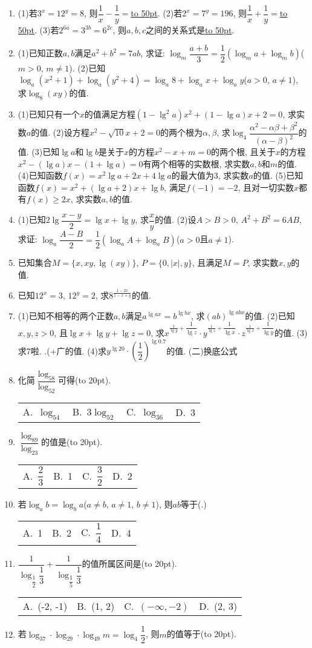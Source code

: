 \documentclass[10pt,a4paper]{article}
\newcommand{\blank}[1]{\underline{\hbox to #1pt{}}}
\newcommand{\bracket}[1]{(\hbox to #1pt{})}
\newcommand{\fourch}[4]{\par\begin{tabular}{p{.23\textwidth}p{.23\textwidth}p{.23\textwidth}p{.23\textwidth}}
A.~#1 &B.~#2& C.~#3& D.~#4
\end{tabular}}
\begin{document}
\begin{enumerate}[1.]
\item (1)若$3^x=12^y=8$, 则$\dfrac 1x-\dfrac 1y=$\blank{50}.
(2)若$2^x=7^y=196$, 则$\dfrac 1x+\dfrac 1y=$\blank{50}.
(3)若$2^{6a}=3^{3b}=6^{2c}$, 则$a,b,c$之间的关系式是\blank{50}.
\item (1)已知正数$a,b$满足$a^2+b^2=7ab$, 求证: $\log _m\dfrac{a+b}3=\dfrac 12(\log _ma+\log _mb)$($m>0$, $m\ne 1$).
(2)已知$\log _a(x^2+1)+\log _a(y^2+4)=\log _a8+\log _ax+\log _ay$($a>0$, $a\ne 1$), 求$\log _8(xy)$的值.
\item (1)已知只有一个$x$的值满足方程$(1-\lg ^2a)x^2+(1-\lg a)x+2=0$, 求实数$a$的值.
(2)设方程$x^2-\sqrt {10}x+2=0$的两个根为$\alpha ,\beta$, 求$\log _4\dfrac{\alpha ^2-\alpha \beta +\beta ^2}{(\alpha -\beta)^2}$的值.
(3)已知$\lg a$和$\lg b$是关于$x$的方程$x^2-x+m=0$的两个根, 且关于$x$的方程$x^2-(\lg a)x-(1+\lg a)=0$有两个相等的实数根, 求实数$a,b$和$m$的值.
(4)已知函数$f(x)=x^2\lg a+2x+4\lg a$的最大值为3, 求实数$a$的值.
(5)已知函数$f(x)=x^2+(\lg a+2)x+\lg b$, 满足$f(-1)=-2$, 且对一切实数$x$都有$f(x)\ge 2x$, 求实数$a,b$的值.
\item (1)已知$2\lg \dfrac{x-y}2=\lg x+\lg y$, 求$\dfrac xy$的值.
(2)设$A>B>0$, $A^2+B^2=6AB$, 求证: $\log _a\dfrac{A-B}2=\dfrac 12(\log _aA+\log _aB)$($a>0$且$a\ne 1$).
\item 已知集合$M=\{x,xy,\lg (xy)\}$, $P=\{0,|x|,y\}$, 且满足$M=P$, 求实数$x,y$的值.
\item 已知$12^x=3$, $12^y=2$, 求$8^{\frac{1-2x}{1-x+y}}$的值.
\item (1)已知不相等的两个正数$a,b$满足$a^{\lg ax}=b^{\lg bx}$, 求$(ab)^{\lg abx}$的值.
(2)已知$x,y,z>0$, 且$\lg x+\lg y+\lg z=0$, 求$x^{\frac 1{\lg y}+\dfrac 1{\lg z}}\cdot y^{\frac 1{\lg z}+\dfrac 1{\lg x}}\cdot z^{\frac 1{\lg x}+\dfrac 1{\lg y}}$的值.
(3)求7啦. .(+广的值.
(4)求$y^{\lg 20}\cdot (\dfrac 12)^{\lg 0.7}$的值.
(二)换底公式
\item 化简$\dfrac{\log _58}{\log _52}$可得\bracket{20}.
\fourch{$\log _54$}{$3\log _52$}{$\log _36$}{3}
\item $\dfrac{\log _89}{\log _23}$的值是\bracket{20}.
\fourch{$\dfrac 23$}{1}{$\dfrac 32$}{2}
\item 若$\log _ab=\log _ba$($a\ne b$, $a\ne 1$, $b\ne 1$), 则$ab$等于(.)
\fourch{1}{2}{$\dfrac 14$}{4}
\item $\dfrac 1{\log _{\dfrac 12}\dfrac 13}+\dfrac 1{\log _{\dfrac 15}\dfrac 13}$的值所属区间是\bracket{20}.
\fourch{(-2, -1)}{(1, 2)}{$(-\infty ,-2)$}{(2, 3)}
\item 若$\log _37\cdot \log _29\cdot \log _{49}m=\log _4\dfrac 12$, 则$m$的值等于\bracket{20}.

\end{enumerate}
\end{document}
